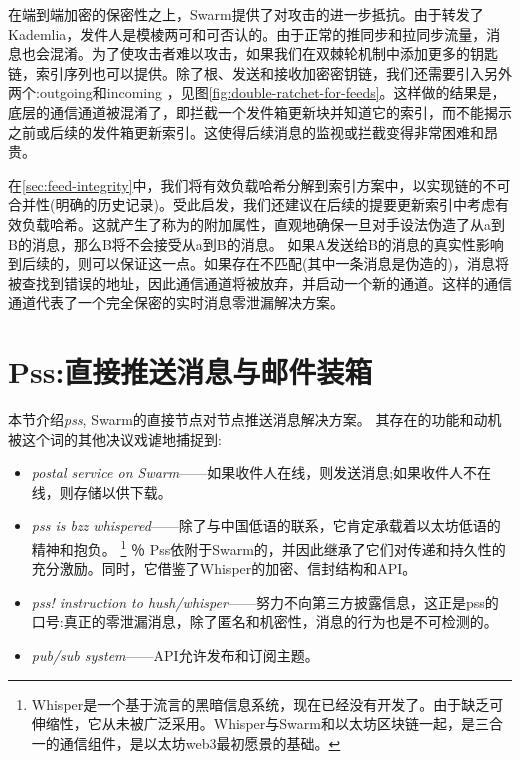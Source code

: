 在端到端加密的保密性之上，Swarm提供了对攻击的进一步抵抗。由于转发了Kademlia，发件人是模棱两可和可否认的。由于正常的推同步和拉同步流量，消息也会混淆。为了使攻击者难以攻击，如果我们在双棘轮机制中添加更多的钥匙链，索引序列也可以提供。除了根、发送和接收加密密钥链，我们还需要引入另外两个:outgoing和incoming ，见图\ref{fig:double-ratchet-for-feeds}。这样做的结果是，底层的通信通道被混淆了，即拦截一个发件箱更新块并知道它的索引，而不能揭示之前或后续的发件箱更新索引。这使得后续消息的监视或拦截变得非常困难和昂贵。

在\ref{sec:feed-integrity}中，我们将有效负载哈希分解到索引方案中，以实现链的不可合并性(明确的历史记录)。受此启发，我们还建议在后续的提要更新索引中考虑有效负载哈希。这就产生了称为的附加属性，直观地确保一旦对手设法伪造了从a到B的消息，那么B将不会接受从a到B的消息。
如果A发送给B的消息的真实性影响到后续的，则可以保证这一点。如果存在不匹配(其中一条消息是伪造的)，消息将被查找到错误的地址，因此通信通道将被放弃，并启动一个新的通道。这样的通信通道代表了一个完全保密的实时消息零泄漏解决方案。




\section{Pss:直接推送消息与邮件装箱\statusgreen}\label{sec:pss}

\green{}

本节介绍\emph{pss}, Swarm的直接节点对节点推送消息解决方案。
其存在的功能和动机被这个词的其他决议戏谑地捕捉到:

\begin{itemize}
\item \emph{postal service on Swarm}——如果收件人在线，则发送消息;如果收件人不在线，则存储以供下载。
\item \emph{pss is bzz whispered}——除了与中国低语的联系，它肯定承载着以太坊低语的精神和抱负。%
%
\footnote{Whisper是一个基于流言的黑暗信息系统，现在已经没有开发了。由于缺乏可伸缩性，它从未被广泛采用。Whisper与Swarm和以太坊区块链一起，是三合一的通信组件，是以太坊web3最初愿景的基础。}
％
Pss依附于Swarm的，并因此继承了它们对传递和持久性的充分激励。同时，它借鉴了Whisper的加密、信封结构和API。
\item \emph{pss! instruction to hush/whisper}——努力不向第三方披露信息，这正是pss的口号:真正的零泄漏消息，除了匿名和机密性，消息的行为也是不可检测的。
\item  \emph{pub/sub system}——API允许发布和订阅主题。
\end{itemize}

